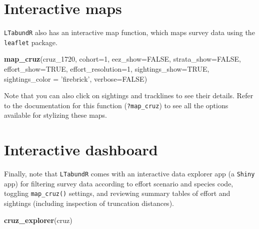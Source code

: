 \documentclass[
]{book}
\newenvironment{Shaded}{\begin{snugshade}}{\end{snugshade}}
\newcommand{\DataTypeTok}[1]{\textcolor[rgb]{0.13,0.29,0.53}{#1}}
\newcommand{\DecValTok}[1]{\textcolor[rgb]{0.00,0.00,0.81}{#1}}
\newcommand{\KeywordTok}[1]{\textcolor[rgb]{0.13,0.29,0.53}{\textbf{#1}}}
\newcommand{\NormalTok}[1]{#1}
\newcommand{\OtherTok}[1]{\textcolor[rgb]{0.56,0.35,0.01}{#1}}
\newcommand{\StringTok}[1]{\textcolor[rgb]{0.31,0.60,0.02}{#1}}
\begin{document}
\hypertarget{interactive-maps}{%
\section*{Interactive maps}\label{interactive-maps}}

\texttt{LTabundR} also has an interactive map function, which maps survey data using the \texttt{leaflet} package.

\begin{Shaded}
\begin{Highlighting}[]
 \KeywordTok{map_cruz}\NormalTok{(cruz_}\DecValTok{1720}\NormalTok{,}
          \DataTypeTok{cohort=}\DecValTok{1}\NormalTok{,}
          \DataTypeTok{eez_show=}\OtherTok{FALSE}\NormalTok{,}
          \DataTypeTok{strata_show=}\OtherTok{FALSE}\NormalTok{,}
          \DataTypeTok{effort_show=}\OtherTok{TRUE}\NormalTok{,}
          \DataTypeTok{effort_resolution=}\DecValTok{1}\NormalTok{,}
          \DataTypeTok{sightings_show=}\OtherTok{TRUE}\NormalTok{,}
          \DataTypeTok{sightings_color =} \StringTok{'firebrick'}\NormalTok{,}
          \DataTypeTok{verbose=}\OtherTok{FALSE}\NormalTok{)}
\end{Highlighting}
\end{Shaded}

Note that you can also click on sightings and tracklines to see their details. Refer to the documentation for this function (\texttt{?map\_cruz}) to see all the options available for stylizing these maps.

\hypertarget{interactive-dashboard}{%
\section*{Interactive dashboard}\label{interactive-dashboard}}

Finally, note that \texttt{LTabundR} comes with an interactive data explorer app (a \texttt{Shiny} app) for filtering survey data according to effort scenario and species code, toggling \texttt{map\_cruz()} settings, and reviewing summary tables of effort and sightings (including inspection of truncation distances).

\begin{Shaded}
\begin{Highlighting}[]
\KeywordTok{cruz_explorer}\NormalTok{(cruz)}
\end{Highlighting}
\end{Shaded}
\end{document}
